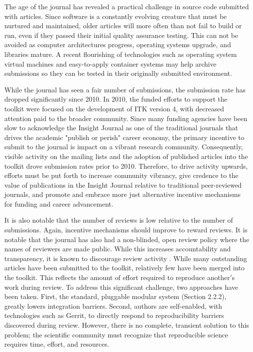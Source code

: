 \documentclass{frontiersENG} %
\begin{document}
The age of the journal has revealed a practical challenge in source code
submitted with articles. Since software is a constantly evolving creature that
must be nurtured and maintained, older articles will more often than not fail
to build or run, even if they passed their initial quality assurance testing.
This can not be avoided as computer architectures progress, operating systems
upgrade, and libraries mature. A recent flourishing of technologies such as
operating system virtual machines and easy-to-apply container systems may help
archive submissions so they can be tested in their originally submitted
environment.

While the journal has seen a fair number of submissions, the submission rate
has dropped significantly since 2010. In 2010, the funded efforts to support
the toolkit were focused on the development of ITK version 4, with decreased
attention paid to the broader community.  Since many funding agencies have been
slow to acknowledge the Insight Journal as one of the traditional journals
that drives the academic "publish or perish" career economy, the primary
incentive to submit to the journal is impact on a vibrant research community.
Consequently, visible activity on the mailing lists and the adoption of published
articles into the toolkit drove submission rates prior to 2010. Therefore, to
drive activity upwards, efforts must be put forth to increase community
vibrancy, give credence to the value of publications in the Insight Journal
relative to traditional peer-reviewed journals, and promote and embrace more
just alternative incentive mechanisms for funding and career advancement.

It is also notable that the number of reviews is low relative to the number of
submissions. Again, incentive mechanisms should improve to reward reviews.  It
is notable that the journal has also had a non-blinded, open review policy where
the names of reviewers are made public. While this increases accountability and
transparency, it is known to discourage review activity
\cite{Rooyen1999,Walsh2000}. While many outstanding articles have been
submitted to the toolkit, relatively few have been merged into the toolkit.
This reflects the amount of effort required to reproduce another$'$s work during
review.  To address this significant challenge, two approaches have been taken.
First, the standard, pluggable modular system (Section 2.2.2), greatly lowers
integration barriers.  Second, authors are self-enabled, with technologies such
as Gerrit, to directly respond to reproducibility barriers discovered during
review. However, there is no complete, transient solution to this problem; the
scientific community must recognize that reproducible science requires time,
effort, and resources.
\end{document}
